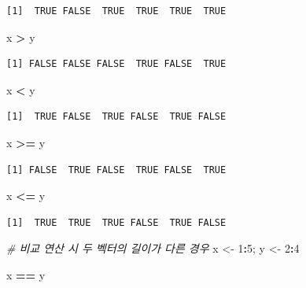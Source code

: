 \documentclass[
  11pt,
]{krantz}
\newenvironment{Shaded}{\begin{snugshade}}{\end{snugshade}}
\newcommand{\CommentTok}[1]{\textcolor[rgb]{0.37,0.37,0.37}{\textit{#1}}}
\newcommand{\DecValTok}[1]{\textcolor[rgb]{0.06,0.06,0.06}{#1}}
\newcommand{\NormalTok}[1]{#1}
\newcommand{\OperatorTok}[1]{\textcolor[rgb]{0.43,0.43,0.43}{\textbf{#1}}}
\newcommand{\StringTok}[1]{\textcolor[rgb]{0.5,0.5,0.5}{#1}}
\begin{document}
\begin{verbatim}
[1]  TRUE FALSE  TRUE  TRUE  TRUE  TRUE
\end{verbatim}

\begin{Shaded}
\begin{Highlighting}[]
\NormalTok{x }\OperatorTok{>}\StringTok{ }\NormalTok{y}
\end{Highlighting}
\end{Shaded}

\begin{verbatim}
[1] FALSE FALSE FALSE  TRUE FALSE  TRUE
\end{verbatim}

\begin{Shaded}
\begin{Highlighting}[]
\NormalTok{x }\OperatorTok{<}\StringTok{ }\NormalTok{y}
\end{Highlighting}
\end{Shaded}

\begin{verbatim}
[1]  TRUE FALSE  TRUE FALSE  TRUE FALSE
\end{verbatim}

\begin{Shaded}
\begin{Highlighting}[]
\NormalTok{x }\OperatorTok{>=}\StringTok{ }\NormalTok{y}
\end{Highlighting}
\end{Shaded}

\begin{verbatim}
[1] FALSE  TRUE FALSE  TRUE FALSE  TRUE
\end{verbatim}

\begin{Shaded}
\begin{Highlighting}[]
\NormalTok{x }\OperatorTok{<=}\StringTok{ }\NormalTok{y}
\end{Highlighting}
\end{Shaded}

\begin{verbatim}
[1]  TRUE  TRUE  TRUE FALSE  TRUE FALSE
\end{verbatim}

\begin{Shaded}
\begin{Highlighting}[]
\CommentTok{# 비교 연산 시 두 벡터의 길이가 다른 경우}
\NormalTok{x <-}\StringTok{ }\DecValTok{1}\OperatorTok{:}\DecValTok{5}\NormalTok{; y <-}\StringTok{ }\DecValTok{2}\OperatorTok{:}\DecValTok{4}

\NormalTok{x }\OperatorTok{==}\StringTok{ }\NormalTok{y}
\end{Highlighting}
\end{Shaded}
\end{document}
